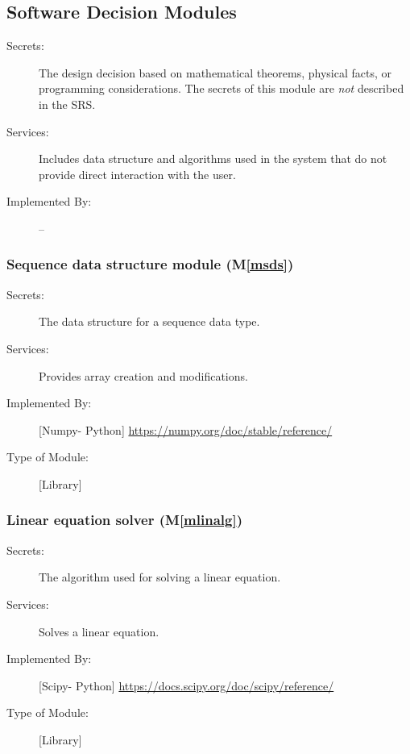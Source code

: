 \documentclass[12pt, titlepage]{article}
\newcommand{\mref}[1]{M\ref{#1}}
\begin{document}
\subsection{Software Decision Modules}

\begin{description}
\item[Secrets:] The design decision based on mathematical theorems, physical
  facts, or programming considerations. The secrets of this module are
  \emph{not} described in the SRS.
\item[Services:] Includes data structure and algorithms used in the system that
  do not provide direct interaction with the user. 
\item[Implemented By:] --
\end{description}
\subsubsection{Sequence data structure module (\mref{msds})}

\begin{description}
\item[Secrets:]The data structure  for a sequence data type.
\item[Services:] Provides array creation and modifications.
\item[Implemented By:] [Numpy- Python] \url{https://numpy.org/doc/stable/reference/}
\item[Type of Module:] [Library]

 
\end{description}
\subsubsection{Linear equation solver (\mref{mlinalg})}

\begin{description}
\item[Secrets:]The algorithm used for solving a linear equation.
\item[Services:] Solves a linear equation.
\item[Implemented By:] [Scipy- Python] \url{https://docs.scipy.org/doc/scipy/reference/}
\item[Type of Module:] [Library]
  
\end{description}
\end{document}
